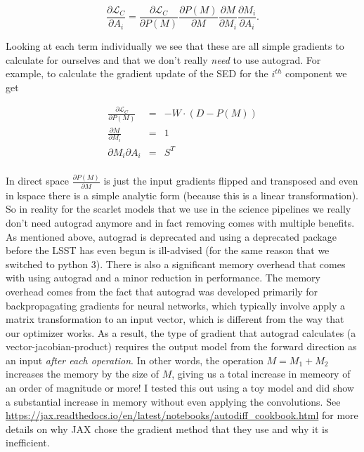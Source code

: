 \documentclass[DM,authoryear,toc]{lsstdoc}
\begin{document}
\begin{equation}
  \frac{\partial\mathcal{L}_C}{\partial A_i} = \frac{\partial\mathcal{L}_C}{\partial P(M)} \frac{\partial P(M)}{\partial M} \frac{\partial M}{\partial M_i} \frac{\partial M_i}{\partial A_i}. \label{eq:full_grad}
\end{equation}

Looking at each term individually we see that these are all simple gradients to calculate for ourselves and that we don't really \emph{need} to use autograd. For example, to calculate the gradient update of the SED for the $i^{th}$ component we get

\begin{align}
  \frac{\partial\mathcal{L}_C}{\partial P(M)} &=& -W\cdot(D-P(M)) \\
  \frac{\partial M}{\partial M_i} &=& 1 \\
  {\partial M_i}{\partial A_i} &=& S^T \\
\end{align}

In direct space $\frac{\partial P(M)}{\partial M}$ is just the input gradients flipped and transposed and even in kspace there is a simple analytic form (because this is a linear transformation). So in reality for the scarlet models that we use in the science pipelines we really don't need autograd anymore and in fact removing comes with multiple benefits. As mentioned above, autograd is deprecated and using a deprecated package before the LSST has even begun is ill-advised (for the same reason that we switched to python 3). There is also a significant memory overhead that comes with using autograd and a minor reduction in performance. The memory overhead comes from the fact that autograd was developed primarily for backpropagating gradients for neural networks, which typically involve apply a matrix transformation to an input vector, which is different from the way that our optimizer works. As a result, the type of gradient that autograd calculates (a vector-jacobian-product) requires the output model from the forward direction as an input \emph{after each operation}. In other words, the operation $M = M_1 + M_2$ increases the memory by the size of $M$, giving us a total increase in memeory of an order of magnitude or more! I tested this out using a toy model and did show a substantial increase in memory without even applying the convolutions. See \url{https://jax.readthedocs.io/en/latest/notebooks/autodiff_cookbook.html} for more details on why JAX chose the gradient method that they use and why it is inefficient.
\end{document}
